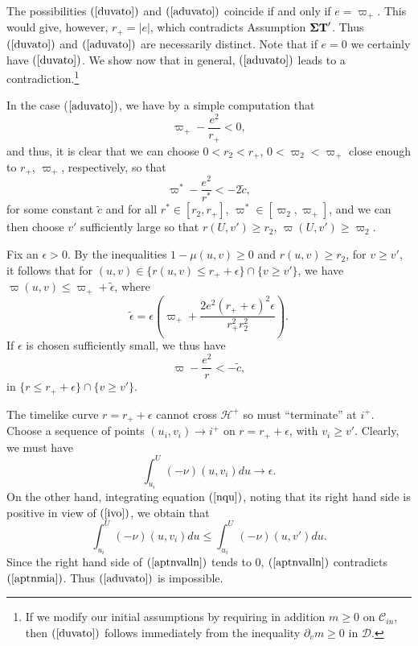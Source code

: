 \documentclass{article}
\begin{document}
The possibilities $(\ref{duvato})$ and $(\ref{aduvato})$
coincide if and only if $e=\varpi_+$. This would give, however, $r_+=|e|$, 
which contradicts Assumption ${\bf \Sigma T}'$. Thus $(\ref{duvato})$ and $(\ref{aduvato})$ are 
necessarily distinct. Note that if $e=0$ we certainly have $(\ref{duvato})$. 
We show now that in general,
$(\ref{aduvato})$ leads to a contradiction.\footnote{If we modify our
initial assumptions by requiring in addition $m\ge0$ on $\mathcal{C}_{in}$, 
then $(\ref{duvato})$ follows immediately from
the inequality $\partial_v m\ge0$ in $\mathcal{D}$.}

In the case ($\ref{aduvato})$, 
we have by a simple computation that
\[
\varpi_+-\frac{e^2}{r_+}<0,
\]
and thus,
it is clear that we can choose $0<r_2<r_+$, $0<\varpi_2<\varpi_+$ close enough to 
$r_+$, $\varpi_+$, respectively, so that
\[
\varpi^*-\frac{e^2}{r^*}<-2\tilde{c},
\]
for some constant $\tilde{c}$ and
for all $r^*\in[r_2,r_+]$, $\varpi^*\in[\varpi_2,\varpi_+]$,
and we can then choose $v'$ sufficiently large so that
$r(U,v')\ge r_2$, $\varpi(U,v')\ge \varpi_2$.

Fix an $\epsilon>0$. By the inequalities
$1-\mu(u,v)\ge0$ and $r(u,v)\ge r_2$, for $v\ge v'$,
it follows that for $(u,v)\in\{r(u,v)\le r_++\epsilon\}\cap\{v\ge v'\}$, 
we have 
$\varpi(u,v)\le\varpi_++\tilde{\epsilon}$, 
where
\[
\tilde{\epsilon}=\epsilon\left(\varpi_++\frac{2e^2(r_++\epsilon)^2\epsilon}{r_+^2r_2^2}\right).
\]
If $\epsilon$ is chosen sufficiently small, we thus have
\begin{equation}
\label{ivo}
\varpi-\frac{e^2}r<-\tilde{c},
\end{equation}
in $\{r\le r_++\epsilon\}\cap\{v\ge v'\}$.

The timelike curve $r=r_++\epsilon$ cannot cross $\mathcal{H}^+$ so must
``terminate'' at $i^+$. Choose a sequence of points $(u_i,v_i)\to i^+$
on $r=r_++\epsilon$, with $v_i\ge v'$. Clearly, we must have
\begin{equation}
\label{aptnmia}
\int_{u_i}^U{(-\nu)(u,v_i) du}\to\epsilon.
\end{equation}
On the other hand, integrating equation
$(\ref{nqu})$,
noting that its right hand side is positive in view of $(\ref{ivo})$,
we obtain that 
\begin{equation}
\label{aptnvalln}
\int_{u_i}^U{(-\nu)(u,v_i) du}\le\int_{u_i}^U{(-\nu)(u,v') du}.
\end{equation}
Since the right hand side of $(\ref{aptnvalln})$ tends to $0$,
$(\ref{aptnvalln})$ contradicts $(\ref{aptnmia})$. Thus $(\ref{aduvato})$ is impossible.
\end{document}
